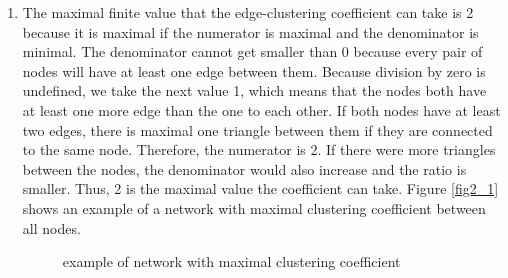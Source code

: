 \documentclass[10pt,a4paper]{article}
\begin{document}
\begin{enumerate}
\item The maximal finite value that the edge-clustering coefficient can take is 2 because it is maximal if the numerator is maximal and the denominator is minimal. The denominator cannot get smaller than 0 because every pair of nodes will have at least one edge between them. Because division by zero is undefined, we take the next value 1, which means that the nodes both have at least one more edge than the one to each other. If both nodes have at least two edges, there is maximal one triangle between them if they are connected to the same node. Therefore, the numerator is 2. If there were more triangles between the nodes, the denominator would also increase and the ratio is smaller. Thus, 2 is the maximal value the coefficient can take. Figure \ref{fig2_1} shows an example of a network with maximal clustering coefficient between all nodes.\\
\newline
\begin{figure}
\begin{center}
\caption{example of network with maximal clustering coefficient}
\end{center}
\end{figure}


\end{enumerate}
\end{document}
